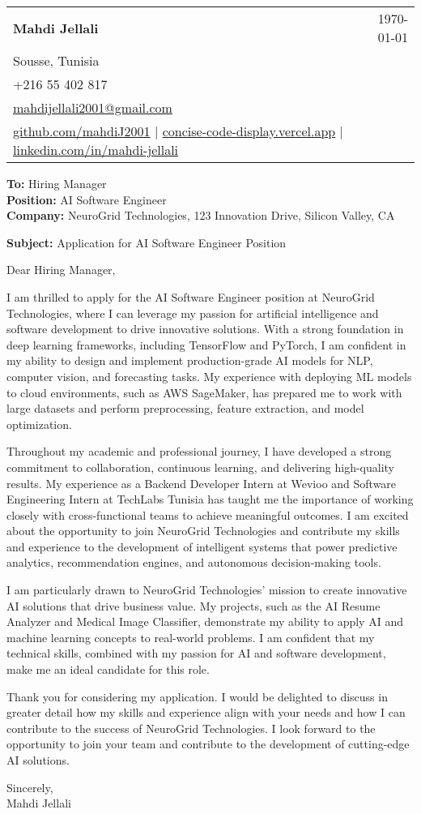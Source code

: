 \documentclass[letterpaper,11pt]{article}
\makeatletter
\newcommand{\letterHeading}[5]{
    \begin{tabular*}{\textwidth}{l@{\extracolsep{\fill}}r}
    \textbf{\Large #1} & #5 \\  %
    #2 & \\
    #3 & \\
    #4 & \\
    \end{tabular*}
    \vspace{15pt}
}
\newcommand{\letterRecipient}[3]{
    \textbf{\large To:} #1 \\
    \textbf{\large Position:} #2 \\
    \textbf{\large Company:} #3 \\
    \vspace{12pt}
}
\newcommand{\letterSubject}[1]{
    \textbf{\large Subject:} #1 \\
    \vspace{15pt}
}
\makeatother
\begin{document}
    \letterHeading
    {Mahdi Jellali}
    {Sousse, Tunisia}
    {+216 55 402 817 \\ \href{mailto:mahdijellali2001@gmail.com}{mahdijellali2001@gmail.com}}
    {\href{https://github.com/mahdiJ2001}{github.com/mahdiJ2001} $|$ \href{https://concise-code-display.vercel.app/}{concise-code-display.vercel.app} $|$ \href{https://www.linkedin.com/in/mahdi-jellali/}{linkedin.com/in/mahdi-jellali}}
    {\today}

    \letterRecipient
    {Hiring Manager}
    {AI Software Engineer}
    {NeuroGrid Technologies, 123 Innovation Drive, Silicon Valley, CA}

    \letterSubject{Application for AI Software Engineer Position}

    Dear Hiring Manager,

    I am thrilled to apply for the AI Software Engineer position at NeuroGrid Technologies, where I can leverage my passion for artificial intelligence and software development to drive innovative solutions. With a strong foundation in deep learning frameworks, including TensorFlow and PyTorch, I am confident in my ability to design and implement production-grade AI models for NLP, computer vision, and forecasting tasks. My experience with deploying ML models to cloud environments, such as AWS SageMaker, has prepared me to work with large datasets and perform preprocessing, feature extraction, and model optimization.

    Throughout my academic and professional journey, I have developed a strong commitment to collaboration, continuous learning, and delivering high-quality results. My experience as a Backend Developer Intern at Wevioo and Software Engineering Intern at TechLabs Tunisia has taught me the importance of working closely with cross-functional teams to achieve meaningful outcomes. I am excited about the opportunity to join NeuroGrid Technologies and contribute my skills and experience to the development of intelligent systems that power predictive analytics, recommendation engines, and autonomous decision-making tools.

    I am particularly drawn to NeuroGrid Technologies' mission to create innovative AI solutions that drive business value. My projects, such as the AI Resume Analyzer and Medical Image Classifier, demonstrate my ability to apply AI and machine learning concepts to real-world problems. I am confident that my technical skills, combined with my passion for AI and software development, make me an ideal candidate for this role.

    Thank you for considering my application. I would be delighted to discuss in greater detail how my skills and experience align with your needs and how I can contribute to the success of NeuroGrid Technologies. I look forward to the opportunity to join your team and contribute to the development of cutting-edge AI solutions.

    Sincerely,\\[12pt]

    Mahdi Jellali
\end{document}
